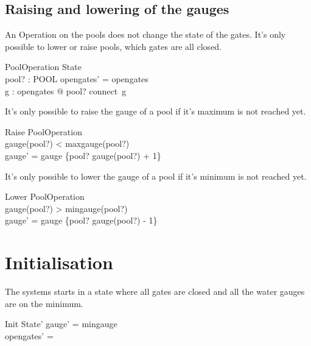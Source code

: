 \documentclass[a4paper]{article}
\begin{document}
\subsection{Raising and lowering of the gauges}
An Operation on the pools does not change the state of the gates.
It's only possible to lower or raise pools, which gates are all
closed.
\begin{schema}{PoolOperation}
  \Delta State\\
  pool? : POOL
  \where
  opengates' = opengates\\
  \forall g : opengates @ pool? \notin connect~g\\
\end{schema}
It's only possible to raise the gauge of a pool if it's maximum is
not reached yet.
\begin{schema}{Raise}
  PoolOperation\\
  \where
  gauge(pool?) < maxgauge(pool?)\\
  gauge' = gauge \oplus \{pool? \mapsto gauge(pool?) + 1\}\\
\end{schema}
It's only possible to lower the gauge of a pool if it's minimum is
not reached yet.
\begin{schema}{Lower}
  PoolOperation\\
  \where
  gauge(pool?) > mingauge(pool?)\\
  gauge' = gauge \oplus \{pool? \mapsto gauge(pool?) - 1\}\\
\end{schema}
  

\section{Initialisation}
The systems starts in a state where all gates are closed and
all the water gauges are on the minimum.
\begin{schema}{Init}
  State'
  \where
  gauge' = mingauge\\
  opengates' = \emptyset\\
\end{schema}
\end{document}

